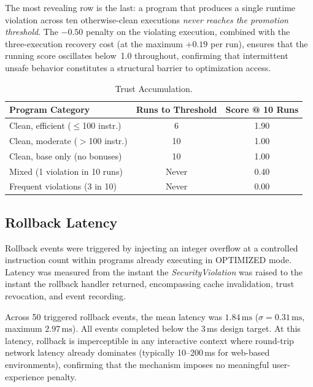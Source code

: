 \documentclass[conference]{IEEEtran}
\begin{document}
The most revealing row is the last: a program that produces a single
runtime violation across ten otherwise-clean executions \emph{never
reaches the promotion threshold}. The $-0.50$ penalty on the
violating execution, combined with the three-execution recovery
cost (at the maximum $+0.19$ per run), ensures that the running
score oscillates below~1.0 throughout, confirming that
intermittent unsafe behavior constitutes a structural barrier to
optimization access.

\begin{table}[t]
\caption{Trust Accumulation.}
\label{tab:trust}
\centering
\renewcommand{\arraystretch}{1.18}
\small
\begin{tabular}{@{} p{3.0cm} c c @{}}
\toprule
\textbf{Program Category} & \textbf{Runs to Threshold} &
\textbf{Score @ 10 Runs} \\
\midrule
Clean, efficient ($\leq$100 instr.)    & 6 & 1.90 \\
Clean, moderate ($>$100 instr.)        & 10 & 1.00 \\
Clean, base only (no bonuses)          & 10 & 1.00 \\
Mixed (1 violation in 10 runs)         & Never & 0.40 \\
Frequent violations (3 in 10)          & Never & 0.00 \\
\bottomrule
\end{tabular}
\end{table}

\subsection{Rollback Latency}

Rollback events were triggered by injecting an integer overflow at
a controlled instruction count within programs already executing in
OPTIMIZED mode. Latency was measured from the instant the
\textit{SecurityViolation} was raised to the instant the rollback
handler returned, encompassing cache invalidation, trust revocation,
and event recording.

Across 50 triggered rollback events, the mean latency was
$1.84\,\text{ms}$ ($\sigma = 0.31\,\text{ms}$, maximum
$2.97\,\text{ms}$). All events completed below the 3\,ms design
target. At this latency, rollback is imperceptible in any interactive
context where round-trip network latency already dominates
(typically 10--200\,ms for web-based environments), confirming
that the mechanism imposes no meaningful user-experience penalty.
\end{document}
